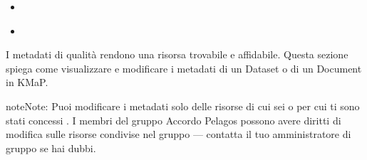 \documentclass[letterpaper,10pt,english]{sphinxmanual}
\begin{document}
\begin{sphinxcontents}
\begin{itemize}
\begin{itemize}
\item {} 
\sphinxAtStartPar
{}\label{\detokenize{it/03_gestire_metadati:id9}}{\hyperref[\detokenize{it/03_gestire_metadati:estensione-spaziale}]{}}

\item {} 
\sphinxAtStartPar
{}\label{\detokenize{it/03_gestire_metadati:id10}}{\hyperref[\detokenize{it/03_gestire_metadati:campi-data}]{}}

\item {} 
\sphinxAtStartPar
{}\label{\detokenize{it/03_gestire_metadati:id11}}{\hyperref[\detokenize{it/03_gestire_metadati:licenza}]{}}

\item {} 
\sphinxAtStartPar
{}\label{\detokenize{it/03_gestire_metadati:id12}}{\hyperref[\detokenize{it/03_gestire_metadati:punto-di-contatto}]{}}

\item {} 
\sphinxAtStartPar
{}\label{\detokenize{it/03_gestire_metadati:id13}}{\hyperref[\detokenize{it/03_gestire_metadati:miniatura}]{}}

\end{itemize}

\item {} 
\sphinxAtStartPar
{}\label{\detokenize{it/03_gestire_metadati:id14}}{\hyperref[\detokenize{it/03_gestire_metadati:salvare-le-modifiche}]{}}

\item {} 
\sphinxAtStartPar
{}\label{\detokenize{it/03_gestire_metadati:id15}}{\hyperref[\detokenize{it/03_gestire_metadati:lista-di-controllo-per-la-completezza-dei-metadati}]{}}

\end{itemize}
\end{sphinxcontents}

\sphinxAtStartPar
I metadati di qualità rendono una risorsa trovabile e affidabile. Questa sezione spiega
come visualizzare e modificare i metadati di un Dataset o di un Document in KMaP.

\begin{sphinxadmonition}{note}{Note:}
\sphinxAtStartPar
Puoi modificare i metadati solo delle risorse di cui sei  o per cui
ti sono stati concessi . I membri del gruppo Accordo Pelagos
possono avere diritti di modifica sulle risorse condivise nel gruppo — contatta il
tuo amministratore di gruppo se hai dubbi.
\end{sphinxadmonition}
\end{document}
